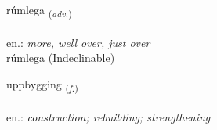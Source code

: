 \documentclass[frontgrid, backgrid]{flacards}\usepackage[]{graphicx}\usepackage[]{xcolor}
\begin{document}
\renewcommand{\blhead}{\vskip5pt {\small\bfseries\footnotesize Atviksorð | Adverb }}
\renewcommand{\bcfoot}{\vskip5pt \hspace{2pt}{\small\bfseries\footnotesize 1K}}


{rúmlega \small{\textsubscript{(\textit{adv.})}} \\[1ex]
\textphonetic{[rumlɛɣa]} \\
en.: \emph{more, well over, just over} \\  [2ex]
rúmlega (Indeclinable)}

\renewcommand{\flhead}{\vskip5pt \fboxsep=0pt {\small\bfseries\footnotesize Nafnorð | Noun}}
\renewcommand{\fcfoot}{\vskip5pt \fboxsep=0pt \hspace{2pt}{\small\bfseries\footnotesize 1K}}

\renewcommand{\blhead}{\vskip5pt {\small\bfseries\footnotesize Nafnorð | Noun }}
\renewcommand{\bcfoot}{\vskip5pt \hspace{2pt}{\small\bfseries\footnotesize 1K}}


{uppbygging \small{\textsubscript{(\textit{f.})}} \\[1ex] %
\textphonetic{[ʏhpɪciŋk]} \\
en.: \emph{construction; rebuilding; strengthening} \\  [2ex]
\renewcommand*{\arraystretch}{0.8}
}

\renewcommand{\flhead}{\vskip5pt \fboxsep=0pt {\small\bfseries\footnotesize Sagnorð | Verb}}
\renewcommand{\fcfoot}{\vskip5pt \fboxsep=0pt \hspace{2pt}{\small\bfseries\footnotesize 1K}}

\renewcommand{\blhead}{\vskip5pt {\small\bfseries\footnotesize Sagnorð | Verb }}
\renewcommand{\bcfoot}{\vskip5pt \hspace{2pt}{\small\bfseries\footnotesize 1K}}
\end{document}
